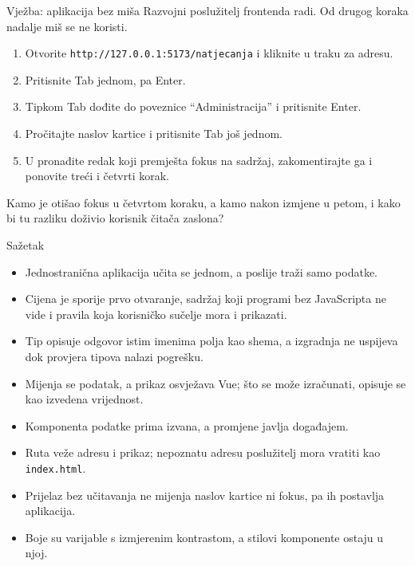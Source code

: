 \begin{frame}{Vježba: aplikacija bez miša}
Razvojni poslužitelj frontenda radi. Od drugog koraka nadalje miš se ne koristi.

\vspace{0.8em}
\begin{enumerate}
  \itemsep0.4em
  \item Otvorite \texttt{http://127.0.0.1:5173/natjecanja} i kliknite u traku za adresu.
  \item Pritisnite Tab jednom, pa Enter.
  \item Tipkom Tab dođite do poveznice \enquote{Administracija} i pritisnite Enter.
  \item Pročitajte naslov kartice i pritisnite Tab još jednom.
  \item U  pronađite redak koji premješta fokus na sadržaj, zakomentirajte ga i ponovite treći i četvrti korak.
\end{enumerate}

\vspace{0.8em}
Kamo je otišao fokus u četvrtom koraku, a kamo nakon izmjene u petom, i kako bi tu razliku doživio korisnik čitača zaslona?
\end{frame}

\begin{frame}{Sažetak}
\begin{itemize}
  \item Jednostranična aplikacija učita se jednom, a poslije traži samo podatke.
  \item Cijena je sporije prvo otvaranje, sadržaj koji programi bez JavaScripta ne vide i pravila koja korisničko sučelje mora i prikazati.
  \item Tip opisuje odgovor istim imenima polja kao shema, a izgradnja ne uspijeva dok provjera tipova nalazi pogrešku.
  \item Mijenja se podatak, a prikaz osvježava Vue; što se može izračunati, opisuje se kao izvedena vrijednost.
  \item Komponenta podatke prima izvana, a promjene javlja događajem.
  \item Ruta veže adresu i prikaz; nepoznatu adresu poslužitelj mora vratiti kao \texttt{index.html}.
  \item Prijelaz bez učitavanja ne mijenja naslov kartice ni fokus, pa ih postavlja aplikacija.
  \item Boje su varijable s izmjerenim kontrastom, a stilovi komponente ostaju u njoj.
\end{itemize}
\end{frame}


